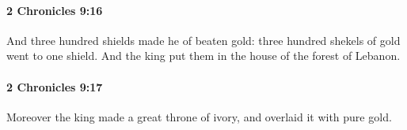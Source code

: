 		\paragraph{2 Chronicles 9:16} %
			\label{2CHRONICLES-9-16}

			And three hundred shields made he of beaten gold: three hundred shekels of gold went to one shield. And the king put them in the house of the forest of Lebanon.


		\paragraph{2 Chronicles 9:17} %
			\label{2CHRONICLES-9-17}

			Moreover the king made a great throne of ivory, and overlaid it with pure gold.


